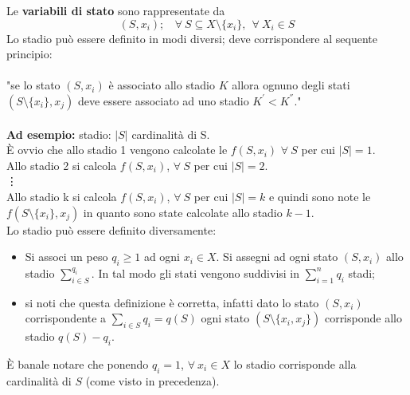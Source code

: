 Le \textbf{variabili di stato} sono rappresentate da
\begin{equation}
	(S,x_{i});\ \ \ \ \forall\ S\subseteq X\setminus\{x_{i}\},\ \ \forall\ X_{i}\in S
\end{equation}
Lo stadio può essere definito in modi diversi; deve corrispondere al sequente principio:\\\\
"se lo stato $(S,x_{i})$ è associato allo stadio $K$ allora ognuno degli stati $(S\setminus\{x_{i}\},x_{j})$ deve essere associato ad uno stadio $K^{'}<K^{''}$."\\\\
\textbf{Ad esempio:} stadio: $|S|$ cardinalità di S.\\
È ovvio che allo stadio 1 vengono calcolate le $f(S,x_{i})$ $\forall\ S$ per cui $|S|=1$.\\
Allo stadio 2 si calcola $f(S,x_{i})$, $\forall\ S$ per cui $|S|=2$.\\
\vdots\\
Allo stadio k si calcola $f(S,x_{i})$, $\forall\ S$ per cui $|S|=k$ e quindi sono note le $f(S\setminus\{x_{i}\},x_{j})$ in quanto sono state calcolate allo stadio $k-1$.\\
Lo stadio può essere definito diversamente:
\begin{itemize}
	\item Si associ un peso $q_{i}\ge 1$ ad ogni $x_{i}\in X$. Si assegni ad ogni stato $(S,x_{i})$ allo stadio $\sum_{i\in S}^{q_{i}}$. In tal modo gli stati vengono suddivisi in $\sum_{i=1}^{n}q_{i}$ stadi;
	\item si noti che questa definizione è corretta, infatti dato lo stato $(S,x_{i})$ corrispondente a $\sum_{i\in S}q_{i}=q(S)$ ogni stato $(S\setminus\{x_{i},x_{j}\})$ corrisponde allo stadio $q(S)-q_{i}$.
\end{itemize}
È banale notare che ponendo $q_{i}=1$, $\forall\ x_{i}\in X$ lo stadio corrisponde alla cardinalità di $S$ (come visto in precedenza).

